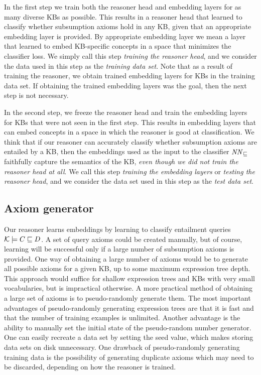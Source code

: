 In the first step we train both the reasoner head and embedding layers for as many diverse KBs as possible.
This results in a reasoner head that learned to classify whether subsumption axioms hold in any KB, given that an appropriate embedding layer is provided.
By appropriate embedding layer we mean a layer that learned to embed KB-specific concepts in a space that minimizes the classifier loss.
We simply call this step \emph{training the reasoner head}, and we consider the data used in this step as the \emph{training data set}.
Note that as a result of training the reasoner, we obtain trained embedding layers for KBs in the training data set.
If obtaining the trained embedding layers was the goal, then the next step is not necessary.

In the second step, we freeze the reasoner head and train the embedding layers for KBs that were not seen in the first step.
This results in embedding layers that can embed concepts in a space in which the reasoner is good at classification.
We think that if our reasoner can accurately classify whether subsumption axioms are entailed by a KB, then the embeddings used as the input to the classifier $\mathit{NN}_\sqsubseteq$ faithfully capture the semantics of the KB, \emph{even though we did not train the reasoner head at all}.
We call this step \emph{training the embedding layers} or \emph{testing the reasoner head}, and we consider the data set used in this step as the \emph{test data set}.



\subsection{Axiom generator}
\label{sec:random_axiom}

Our reasoner learns embeddings by learning to classify entailment queries $\mathcal{K} \models C \sqsubseteq D$.
A set of query axioms could be created manually, but of course, learning will be successful only if a large number of subsumption axioms is provided.
One way of obtaining a large number of axioms would be to generate all possible axioms for a given KB, up to some maximum expression tree depth.
This approach would suffice for shallow expression trees and KBs with very small vocabularies, but is impractical otherwise.
A more practical method of obtaining a large set of axioms is to pseudo-randomly generate them.
The most important advantages of pseudo-randomly generating expression trees are that it is fast and that the number of training examples is unlimited.
Another advantage is the ability to manually set the initial state of the pseudo-random number generator.
One can easily recreate a data set by setting the seed value, which makes storing data sets on disk unnecessary.
One drawback of pseudo-randomly generating training data is the possibility of generating duplicate axioms which may need to be discarded, depending on how the reasoner is trained.


